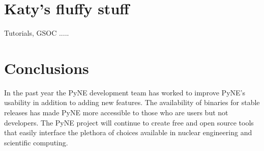 \documentclass{anstrans}
\begin{document}
\section{Katy's fluffy stuff} Tutorials, GSOC .....

\section{Conclusions}

In the past year the PyNE development team has worked to improve PyNE's usability in addition to adding new features. The availability of binaries for stable releases has made PyNE more accessible to those who are users but not developers. The PyNE project will continue to create free and open source tools that easily interface the plethora of choices available in nuclear engineering and scientific computing. 

 
 
\end{document}
